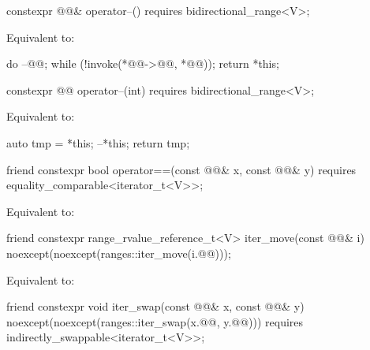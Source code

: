 %
\begin{itemdecl}
constexpr @@& operator--() requires bidirectional_range<V>;
\end{itemdecl}

\begin{itemdescr}
\pnum
\effects
Equivalent to:
\begin{codeblock}
do
  --@@;
while (!invoke(*@@->@@, *@@));
return *this;
\end{codeblock}
\end{itemdescr}

%
\begin{itemdecl}
constexpr @@ operator--(int) requires bidirectional_range<V>;
\end{itemdecl}

\begin{itemdescr}
\pnum
\effects
Equivalent to:
\begin{codeblock}
auto tmp = *this;
--*this;
return tmp;
\end{codeblock}
\end{itemdescr}

%
\begin{itemdecl}
friend constexpr bool operator==(const @@& x, const @@& y)
  requires equality_comparable<iterator_t<V>>;
\end{itemdecl}

\begin{itemdescr}
\pnum
\effects
Equivalent to: 
\end{itemdescr}

%
\begin{itemdecl}
friend constexpr range_rvalue_reference_t<V> iter_move(const @@& i)
  noexcept(noexcept(ranges::iter_move(i.@@)));
\end{itemdecl}

\begin{itemdescr}
\pnum
\effects
Equivalent to: 
\end{itemdescr}

%
\begin{itemdecl}
friend constexpr void iter_swap(const @@& x, const @@& y)
  noexcept(noexcept(ranges::iter_swap(x.@@, y.@@)))
  requires indirectly_swappable<iterator_t<V>>;
\end{itemdecl}

